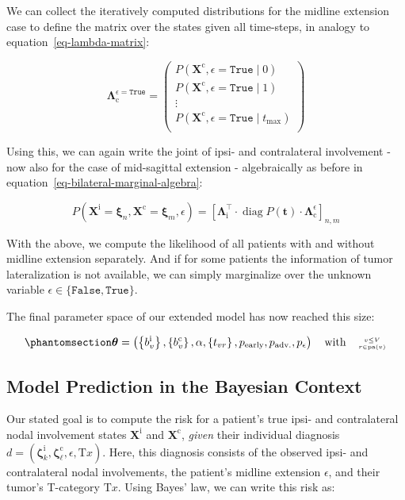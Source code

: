\documentclass[
  sn-mathphys-num,
]{sn-jnl}
\begin{document}
We can collect the iteratively computed distributions for the midline
extension case to define the matrix over the states given all
time-steps, in analogy to equation~\ref{eq-lambda-matrix}:

\[
\boldsymbol{\Lambda}_\text{c}^{\epsilon=\texttt{True}} = \begin{pmatrix}
P \left( \mathbf{X}^\text{c}, \epsilon=\texttt{True} \mid 0 \right) \\
P \left( \mathbf{X}^\text{c}, \epsilon=\texttt{True} \mid 1 \right) \\
\vdots \\
P \left( \mathbf{X}^\text{c}, \epsilon=\texttt{True} \mid t_\text{max} \right) \\
\end{pmatrix}
\]

Using this, we can again write the joint of ipsi- and contralateral
involvement - now also for the case of mid-sagittal extension -
algebraically as before in equation~\ref{eq-bilateral-marginal-algebra}:

\[
P \left( \mathbf{X}^\text{i} = \boldsymbol{\xi}_n, \mathbf{X}^\text{c} = \boldsymbol{\xi}_m, \epsilon \right) = \left[ \boldsymbol{\Lambda}^\intercal_\text{i} \cdot \operatorname{diag} P(\mathbf{t}) \cdot \boldsymbol{\Lambda}_\text{c}^\epsilon \right]_{n,m}
\]

With the above, we compute the likelihood of all patients with and
without midline extension separately. And if for some patients the
information of tumor lateralization is not available, we can simply
marginalize over the unknown variable
\(\epsilon \in \{ \texttt{False}, \texttt{True} \}\).

The final parameter space of our extended model has now reached this
size:

\begin{equation}\phantomsection\label{eq-ext-param-space}{
\boldsymbol{\theta} = \left( \left\{ b_v^\text{i} \right\}, \left\{ b_v^\text{c} \right\}, \alpha, \left\{ t_{vr} \right\}, p_\text{early}, p_\text{adv.}, p_\epsilon \right) \quad \text{with} \quad \genfrac{}{}{0pt}{2}{v\leq V}{r\in\operatorname{pa}(v)}
}\end{equation}

\subsection{Model Prediction in the Bayesian
Context}\label{model-prediction-in-the-bayesian-context}

Our stated goal is to compute the risk for a patient's true ipsi- and
contralateral nodal involvement states \(\mathbf{X}^\text{i}\) and
\(\mathbf{X}^\text{c}\), \emph{given} their individual diagnosis
\(d = \left( \boldsymbol{\zeta}^\text{i}_k, \boldsymbol{\zeta}^\text{c}_\ell, \epsilon, \text{T}x \right)\).
Here, this diagnosis consists of the observed ipsi- and contralateral
nodal involvements, the patient's midline extension \(\epsilon\), and
their tumor's T-category \(\text{T}x\). Using Bayes' law, we can write
this risk as:
\end{document}
